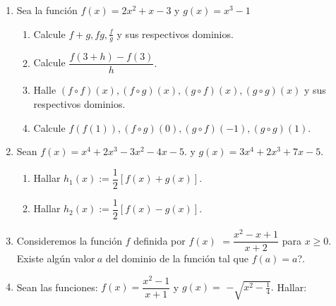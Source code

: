 \begin{enumerate}
\item Sea la funci\'{o}n $f(x)=2x^{2}+x-3$ y $g\left(  x\right)  =x^{3}-1$

\begin{enumerate}
\item Calcule $f+g,fg,\frac{f}{g}$ y sus respectivos dominios.

\item Calcule $\dfrac{f\left(  3+h\right)  -f\left(  3\right)  }{h}.$

\item Halle $\left(  f\circ f\right)  \left(  x\right)  ,\left(  f\circ
g\right)  \left(  x\right)  ,\left(  g\circ f\right)  \left(  x\right)
,\left(  g\circ g\right)  \left(  x\right)  $ y sus respectivos dominios.

\item Calcule $f\left(  f\left(  1\right)  \right)  ,\left(  f\circ g\right)
\left(  0\right)  ,\left(  g\circ f\right)  \left(  -1\right)  ,\left(  g\circ
g\right)  \left(  1\right)  .$
\end{enumerate}

\item Sean $f\left(  x\right)  =x^{4}+2x^{3}-3x^{2}-4x-5.$ y $g\left(
x\right)  =3x^{4}+2x^{3}+7x-5.$

\begin{enumerate}
\item Hallar $h_{1}\left(  x\right)  :=\dfrac{1}{2}\left[  f\left(  x\right)
+g\left(  x\right)  \right]  .$

\item Hallar $h_{2}\left(  x\right)  :=\dfrac{1}{2}\left[  f\left(  x\right)
-g\left(  x\right)  \right]  .$
\end{enumerate}

\item Consideremos la funci\'{o}n $f$ definida por $f(x)$ $=\dfrac{x^{2}%
-x+1}{x+2}$ para $x\geq0.$ \textquestiondown Existe alg\'{u}n valor$\ a$ del
dominio de la funci\'{o}n tal que $f(a)=a$?$.$

\item \label{cap1prob35}Sean las funciones: $f(x)=\dfrac{x^{2}-1}{x+1}$ y
$g(x)=$ $-\sqrt{x^{2}-\frac{1}{4}}.$ Hallar:\vspace{-0.9in}


\end{enumerate}

